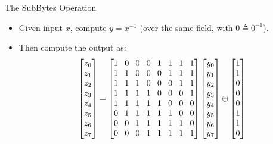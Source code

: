 \documentclass{cubeamer}
\begin{document}
\begin{frame}{The SubBytes Operation}
    \begin{itemize}
        \item Given input $x$, compute $y = x^{-1}$ (over the same field, with $0 \triangleq 0^{-1}$).
        \item Then compute the output as:
        \[
        \setlength{\arraycolsep}{4pt} %
        \begin{bmatrix}
        z_0 \\ z_1 \\ z_2 \\ z_3 \\ z_4 \\ z_5 \\ z_6 \\ z_7
        \end{bmatrix}
        =
        \begin{bmatrix}
        1 & 0 & 0 & 0 & 1 & 1 & 1 & 1 \\
        1 & 1 & 0 & 0 & 0 & 1 & 1 & 1 \\
        1 & 1 & 1 & 0 & 0 & 0 & 1 & 1 \\
        1 & 1 & 1 & 1 & 0 & 0 & 0 & 1 \\
        1 & 1 & 1 & 1 & 1 & 0 & 0 & 0 \\
        0 & 1 & 1 & 1 & 1 & 1 & 0 & 0 \\
        0 & 0 & 1 & 1 & 1 & 1 & 1 & 0 \\
        0 & 0 & 0 & 1 & 1 & 1 & 1 & 1
        \end{bmatrix}
        \begin{bmatrix}
        y_0 \\ y_1 \\ y_2 \\ y_3 \\ y_4 \\ y_5 \\ y_6 \\ y_7
        \end{bmatrix}
        \oplus
        \begin{bmatrix}
        1 \\ 1 \\ 0 \\ 0 \\ 0 \\ 1 \\ 1 \\ 0
        \end{bmatrix}
        \]
    \end{itemize}
\end{frame}
\end{document}
